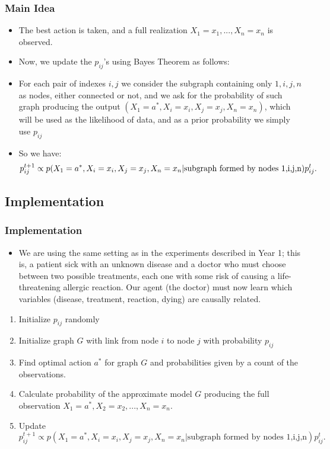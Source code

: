 \documentclass{beamer}
\theoremstyle{plain}
\begin{document}
\begin{frame}
\frametitle{Main Idea}
\begin{itemize}
\item The best action is taken, and a full realization $X_1=x_1,...,X_n=x_n$ is observed.
\item Now, we update the $p_{ij}$'s using Bayes Theorem as follows:
\item For each pair of indexes $i,j$ we consider the subgraph containing only $1,i,j,n$ as nodes, either connected or not, and we ask for the probability of such graph producing the output $(X_1 = a^\ast, X_i = x_i, X_j=x_j, X_n=x_n)$, which will be used as the likelihood of data, and as a prior probability we simply use $p_{ij}$
\item So we have:
\begin{equation}{\label{bayesian_updating}}
p_{ij}^{t+1} \propto p(X_1 = a^\ast, X_i = x_i, X_j=x_j, X_n=x_n | \textrm{subgraph formed by nodes 1,i,j,n})p_{ij}^t.
\end{equation}
\end{itemize}
\end{frame}

\subsection{Implementation}
\begin{frame}
\frametitle{Implementation}
\begin{itemize}
\item We are using the same setting as in the experiments described in Year 1; this is, a patient sick with an unknown disease and a doctor who must choose between two possible treatments, each one with some risk of causing a life-threatening allergic reaction. Our agent (the doctor) must now learn which variables (disease, treatment, reaction, dying) are causally related.
\end{itemize}
\begin{enumerate}
\item Initialize $p_{ij}$ randomly
\item Initialize graph $G$ with link from node $i$ to node $j$ with probability $p_{ij}$
\item Find optimal action $a^\ast$ for graph $G$ and probabilities given by a count of the observations.
\item Calculate probability of the approximate model $G$ producing the full observation $X_1 = a^\ast, X_2=x_2,...,X_n=x_n$. 
\item Update $p_{ij}^{t+1} \propto p(X_1 = a^\ast, X_i = x_i, X_j=x_j, X_n=x_n | \textrm{subgraph formed by nodes 1,i,j,n})p_{ij}^t.$
\end{enumerate}
\end{frame}
\end{document}
